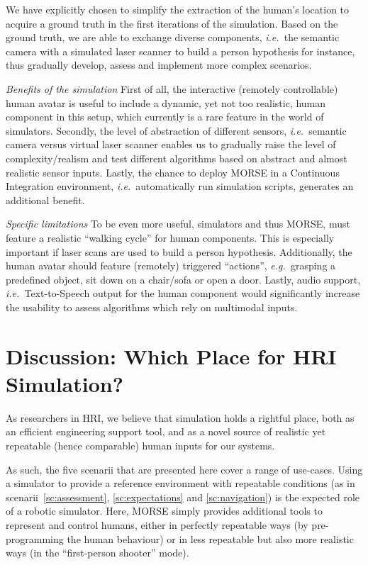 \documentclass[conference]{IEEEtran}
\newcommand{\eg}{{\textit{e.g.~}}}
\newcommand{\ie}{{\textit{i.e.~}}}
\begin{document}
We have explicitly chosen to simplify the extraction of the
human's location to acquire a ground truth in the first iterations of the
simulation. Based on the ground truth, we are able to exchange diverse
components, \ie the semantic camera with a simulated laser scanner
to build a person hypothesis for instance, thus gradually develop, assess and
implement more complex scenarios. 

\emph{Benefits of the simulation} First of all, the interactive (remotely
controllable) human avatar is useful to include a dynamic, yet not too
realistic, human component in this setup, which currently is a rare feature in
the world of simulators. Secondly, the level of abstraction of different
sensors, \ie semantic camera versus virtual laser scanner enables us to
gradually raise the level of complexity/realism and test different algorithms
based on abstract and almost realistic sensor inputs.  Lastly, the chance to
deploy MORSE in a Continuous Integration environment, \ie automatically run
simulation scripts, generates an additional benefit.
 
\emph{Specific limitations} To be even more useful, simulators and thus MORSE, must
feature a realistic ``walking cycle'' for human components. This is especially
important if laser scans are used to build a person hypothesis. Additionally, the
human avatar should feature (remotely) triggered ``actions'', \eg grasping a 
predefined object, sit down on a chair/sofa or open a door. Lastly, audio support, 
\ie Text-to-Speech output for the human component would significantly increase
the usability to assess algorithms which rely on multimodal inputs.  

\section{Discussion: Which Place for HRI Simulation?}

As researchers in HRI, we believe that simulation holds a rightful place, both as
an efficient engineering support tool, and as a novel source of realistic yet
repeatable (hence comparable) human inputs for our systems.

As such, the five scenarii that are presented here cover a range of use-cases.
Using a simulator to provide a reference environment with repeatable conditions
(as in scenarii~\ref{sc:assessment}, \ref{sc:expectations} and
\ref{sc:navigation}) is the expected role of a robotic simulator. Here, MORSE
simply provides additional tools to represent and control humans, either in
perfectly repeatable ways (by pre-programming the human behaviour) or in less
repeatable but also more realistic ways (in the ``first-person shooter'' mode).
\end{document}
